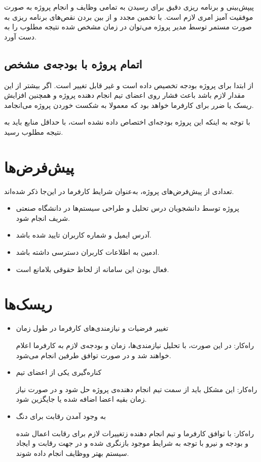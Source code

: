 پیپش‌بینی و برنامه ریزی دقیق برای رسیدن به تمامی وظایف و انجام پروژه به صورت موفقیت آمیز امری لازم است. با تخمین مجدد و از بین بردن نقص‌های برنامه ریزی به صورت مستمر توسط مدیر پروژه می‌توان در زمان مشخص شده نتیجه مطلوب را به دست آورد.

\subsection{اتمام پروژه با بودجه‌ی مشخص}
از ابتدا برای پروژه بودجه تخصیص داده است و غیر قابل تغییر است. اگر بیشتر از این مقدار لازم باشد باعث فشار روی اعضای تیم انجام دهنده پروژه و همچنین افزایش ریسک یا ضرر برای کارفرما خواهد بود که معمولا به شکست خوردن پروژه می‌انجامد.

با توجه به اینکه این پروژه بودجه‌ای اختصاص داده نشده است، با حداقل منابع باید به نتیجه مطلوب رسید.

\section{پیش‌فرض‌ها}
تعدادی از پیش‌فرض‌های پروژه، به‌عنوان شرایط کارفرما در این‌جا ذکر شده‌اند. 
\begin{itemize}
	\item
	پروژه توسط دانشجویان درس تحلیل و طراحی سیستم‌ها در دانشگاه صنعتی شریف انجام شود.
	\item
	آدرس ایمیل و شماره کاربران تایید شده باشد.
	\item 
	ادمین به اطلاعات کاربران دسترسی داشته باشد. 
	\item 
	فعال بودن این سامانه از لحاظ حقوقی بلامانع است.
\end{itemize}

\section{ریسک‌ها}

\begin{itemize}
	\item 
	تغییر فرضیات و نیازمندی‌های کارفرما در طول زمان
	
	راه‌کار:‌ در این صورت، با تحلیل نیازمندی‌ها، زمان و بودجه‌ی لازم به کارفرما اعلام خواهند شد و در صورت توافق طرفین انجام می‌شود.
	\item
	کناره‌گیری یکی از اعضای تیم
	
	راه‌کار: این مشکل باید از سمت تیم انجام دهنده‌ی پروژه حل شود و در صورت نیاز زمان بقیه اعضا اضافه شده یا جایگزین شود.
	\item 
	به وجود آمدن رقابت برای دنگ
	
	راه‌کار:‌ با توافق کارفرما و تیم انجام دهنده زتغییرات لازم برای رقابت اعمال شده و بودجه و نیرو با توجه به شرایط موجود بازنگری شده و در جهت رقابت و ایجاد سیستم بهتر ووظایف انجام داده شوند. 
\end{itemize}

